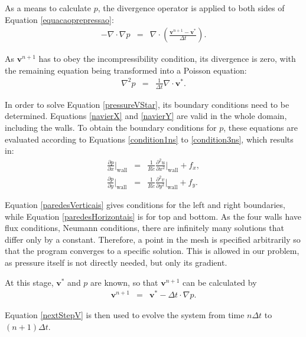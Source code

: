 \documentclass[journal]{IEEEtran}
\begin{document}
As a means to calculate $p$, the divergence operator is applied to both sides of Equation \ref{equacaoprepressao}: \begin{eqnarray}
	-\nabla\cdot\nabla p & = &\nabla\cdot \left(\frac{\textbf{v}^{n+1}-\textbf{v}^*}{\Delta t}\right).
\end{eqnarray}

As $\mathbf{v}^{n+1}$ has to obey the incompressibility condition, its divergence is zero, with the remaining equation being transformed into a Poisson equation: \begin{eqnarray}
\nabla^2 p & = & \frac{1}{\Delta t}\nabla\cdot \textbf{v}^{*}.	 \label{pressureVStar}
\end{eqnarray}



In order to solve Equation \ref{pressureVStar}, its boundary conditions need to be determined. Equations \ref{navierX} and \ref{navierY} are valid in the whole domain, including the walls. To obtain the boundary conditions for $p$, these equations are evaluated according to Equations \ref{condition1ns} to \ref{condition3ns}, which results in:\begin{eqnarray} \frac{\partial p}{\partial x}\Bigg|_{\textrm{wall}}&=&\frac{1}{\mathit{Re}}\frac{\partial^2
u}{\partial x^2}\Bigg|_{\textrm{wall}}+f_x,\label{paredesVerticais}\\
\frac{\partial p}{\partial y}\Bigg|_{\textrm{wall}}&=&\frac{1}{\mathit{Re}}\frac{\partial^2
v}{\partial y^2}\Bigg|_{\textrm{wall}}+f_y.\label{paredesHorizontais}
\end{eqnarray}

Equation \ref{paredesVerticais} gives conditions for the left and right boundaries, while Equation \ref{paredesHorizontais} is for top and bottom. As the four walls have flux conditions, Neumann conditions, there are infinitely many solutions that differ only by a constant. Therefore, a point in the mesh is specified arbitrarily so that the program converges to a specific solution. This is allowed in our problem, as pressure itself is not directly needed, but only its gradient.

At this stage, $\mathbf{v}^*$ and $p$ are known, so that $\mathbf{v}^{n+1}$ can be calculated by \begin{eqnarray}
	\mathbf{v}^{n+1} & = & \mathbf{v}^*  - \Delta t\cdot  \nabla p. \label{nextStepV}
\end{eqnarray}

Equation \ref{nextStepV} is then used to evolve the system from time $n \Delta t$ to $(n+1)\Delta t$. 
\end{document}
